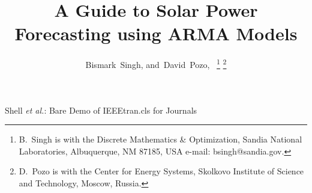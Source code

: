 \documentclass[letter]{IEEEtran}
\begin{document}
%
\title{A Guide to Solar Power Forecasting using ARMA Models}
%
%
%

\author{Bismark~Singh, and~David~Pozo,~
\thanks{B.~Singh is with the Discrete Mathematics \& Optimization, Sandia 
National Laboratories, Albuquerque, NM 87185, USA
e-mail: bsingh@sandia.gov.}%
\thanks{D.~Pozo is with the Center for Energy Systems, Skolkovo Institute of 
Science and Technology, Moscow, Russia.}}%

% 
%



%
{Shell \MakeLowercase{\textit{et al.}}: Bare Demo of IEEEtran.cls for Journals}
% 
\end{document}
